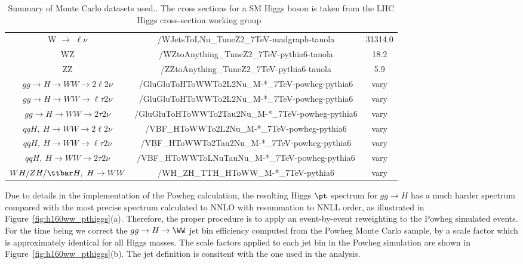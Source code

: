 \begin{table}[!ht]
\begin{center}
{\begin{tabular}{|c|c|c|}
W $\rightarrow$ $\ell\nu$           	 &   /WJetsToLNu\_TuneZ2\_7TeV-madgraph-tauola                         &  31314.0 \\
WZ                               	 &   /WZtoAnything\_TuneZ2\_7TeV-pythia6-tauola                        &  18.2 \\
ZZ                               	 &   /ZZtoAnything\_TuneZ2\_7TeV-pythia6-tauola                        &   5.9\\
$gg \to H \to WW \to 2\ell2\nu$          &   /GluGluToHToWWTo2L2Nu\_M-*\_7TeV-powheg-pythia6                   & vary \\
$gg \to H \to WW \to \ell\tau2\nu$       &   /GluGluToHToWWTo2L2Nu\_M-*\_7TeV-powheg-pythia6                   & vary \\
$gg \to H \to WW \to 2\tau2\nu$          &   /GluGluToHToWWTo2Tau2Nu\_M-*\_7TeV-powheg-pythia6                 & vary \\
$qqH,~H \to WW \to 2\ell2\nu$            &   /VBF\_HToWWTo2L2Nu\_M-*\_7TeV-powheg-pythia6                      & vary \\
$qqH,~ H \to WW \to \ell\tau2\nu$	 &   /VBF\_HToWWTo2Tau2Nu\_M-*\_7TeV-powheg-pythia6                    & vary \\
$qqH,~H \to WW \to 2\tau2\nu$	         &   /VBF\_HToWWToLNuTauNu\_M-*\_7TeV-powheg-pythia6                   & vary \\
$WH/ZH/\ttbar H,~H\to WW$                &   /WH\_ZH\_TTH\_HToWW\_M-*\_7TeV-pythia6                            & vary \\
\hline
\hline
\end{tabular}
}
\caption{Summary of Monte Carlo datasets used.\label{tab:DatasetsMC}. The cross sections for a SM Higgs boson
is taken from the LHC Higgs cross-section working group~\cite{LHCHiggsCrossSectionWorkingGroup:2011ti}}
\end{center}
\end{table}

Due to details in the implementation of the Powheg calculation, the
resulting Higgs $\pt$ spectrum for $gg \to H$ has a much harder
spectrum compared with the most precise spectrum calculated to NNLO
with resummation to NNLL order, as illustrated in
Figure~\ref{fig:h160ww_pthiggs}(a). Therefore, the proper procedure is
to apply an event-by-event reweighting to the Powheg simulated
events. For the time being we correct the $gg \to H \to \WW$ jet bin
efficiency computed from the Powheg Monte Carlo sample, by a scale
factor which is approximately identical for all Higgs masses. The
scale factors applied to each jet bin in the Powheg simulation are
shown in Figure~\ref{fig:h160ww_pthiggs}(b). The jet definition is 
consitent with the one used in the analysis.

